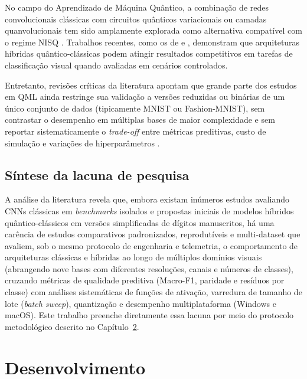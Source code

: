\documentclass[
    12pt,
    openright,
    oneside,
    a4paper,
    english,
    brazil
]{abntex2}
\begin{document}
No campo do Aprendizado de Máquina Quântico, a combinação de redes convolucionais clássicas com circuitos quânticos variacionais ou camadas quanvolucionais tem sido amplamente explorada como alternativa compatível com o regime NISQ \cite{biamonte2017qml,preskill2018nisq,henderson2020quanvolutional,cerezo2021variational}. Trabalhos recentes, como os de  e , demonstram que arquiteturas híbridas quântico-clássicas podem atingir resultados competitivos em tarefas de classificação visual quando avaliadas em cenários controlados.

Entretanto, revisões críticas da literatura apontam que grande parte dos estudos em QML ainda restringe sua validação a versões reduzidas ou binárias de um único conjunto de dados (tipicamente MNIST ou Fashion-MNIST), sem contrastar o desempenho em múltiplas bases de maior complexidade e sem reportar sistematicamente o \textit{trade-off} entre métricas preditivas, custo de simulação e variações de hiperparâmetros \cite{egginger2024hyperparameter,yan2024quantumMedicalImageReview,Gupta2025QMLDigitalHealth}.

\section{Síntese da lacuna de pesquisa}

A análise da literatura revela que, embora existam inúmeros estudos avaliando CNNs clássicas em \textit{benchmarks} isolados e propostas iniciais de modelos híbridos quântico-clássicos em versões simplificadas de dígitos manuscritos, há uma carência de estudos comparativos padronizados, reprodutíveis e multi-dataset que avaliem, sob o mesmo protocolo de engenharia e telemetria, o comportamento de arquiteturas clássicas e híbridas ao longo de múltiplos domínios visuais (abrangendo nove bases com diferentes resoluções, canais e números de classes), cruzando métricas de qualidade preditiva (Macro-F1, paridade e resíduos por classe) com análises sistemáticas de funções de ativação, varredura de tamanho de lote (\textit{batch sweep}), quantização e desempenho multiplataforma (Windows e macOS). Este trabalho preenche diretamente essa lacuna por meio do protocolo metodológico descrito no Capítulo~\ref{cap:desenvolvimento}.


\chapter{Desenvolvimento}
\label{cap:desenvolvimento}
\end{document}
